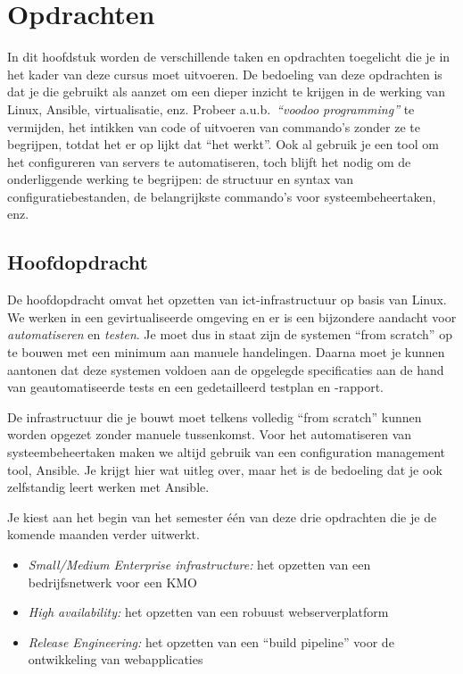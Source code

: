 \chapter{Opdrachten}%
\label{ch:opdrachten}

In dit hoofdstuk worden de verschillende taken en opdrachten toegelicht die je in het kader van deze cursus moet uitvoeren. De bedoeling van deze opdrachten is dat je die gebruikt als aanzet om een dieper inzicht te krijgen in de werking van Linux, Ansible, virtualisatie, enz. Probeer a.u.b.~\emph{``voodoo programming''} te vermijden, het intikken van code of uitvoeren van commando's zonder ze te begrijpen, totdat het er op lijkt dat ``het werkt''. Ook al gebruik je een tool om het configureren van servers te automatiseren, toch blijft het nodig om de onderliggende werking te begrijpen: de structuur en syntax van configuratiebestanden, de belangrijkste commando's voor systeembeheertaken, enz.

\section{Hoofdopdracht}%
\label{sec:hoofdopdracht}

De hoofdopdracht omvat het opzetten van ict-infrastructuur op basis van Linux. We werken in een gevirtualiseerde omgeving en er is een bijzondere aandacht voor \emph{automatiseren} en \emph{testen}. Je moet dus in staat zijn de systemen ``from scratch'' op te bouwen met een minimum aan manuele handelingen. Daarna moet je kunnen aantonen dat deze systemen voldoen aan de opgelegde specificaties aan de hand van geautomatiseerde tests en een gedetailleerd testplan en -rapport.

De infrastructuur die je bouwt moet telkens volledig ``from scratch'' kunnen worden opgezet zonder manuele tussenkomst. Voor het automatiseren van systeembeheertaken maken we altijd gebruik van een configuration management tool, Ansible. Je krijgt hier wat uitleg over, maar het is de bedoeling dat je ook zelfstandig leert werken met Ansible.

Je kiest aan het begin van het semester één van deze drie opdrachten die je de komende maanden verder uitwerkt.

\begin{itemize}
\item \emph{Small/Medium Enterprise infrastructure:} het opzetten van een bedrijfsnetwerk voor een KMO
\item \emph{High availability:} het opzetten van een robuust webserverplatform
\item \emph{Release Engineering:} het opzetten van een ``build pipeline'' voor de ontwikkeling van webapplicaties
\end{itemize}


